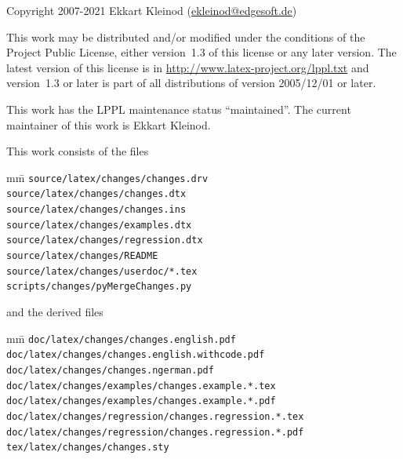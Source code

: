 Copyright 2007-2021 Ekkart Kleinod (\href{mailto:ekleinod@edgesoft.de}{ekleinod@edgesoft.de})

This work may be distributed and/or modified under the conditions of the  Project Public License, either version~1.3 of this license or any later version.
The latest version of this license is in \url{http://www.latex-project.org/lppl.txt} and version~1.3 or later is part of all distributions of  version 2005/12/01 or later.

This work has the LPPL maintenance status ``maintained''.
The current maintainer of this work is Ekkart Kleinod.

This work consists of the files

\begin{tabbing}
	mm\=\kill
	\>\texttt{source/latex/changes/changes.drv}\\
	\>\texttt{source/latex/changes/changes.dtx}\\
	\>\texttt{source/latex/changes/changes.ins}\\
	\>\texttt{source/latex/changes/examples.dtx}\\
	\>\texttt{source/latex/changes/regression.dtx}\\
	\>\texttt{source/latex/changes/README}\\
	\>\texttt{source/latex/changes/userdoc/*.tex}\\

	\>\texttt{scripts/changes/pyMergeChanges.py}
\end{tabbing}


and the derived files

\begin{tabbing}
	mm\=\kill
	\>\texttt{doc/latex/changes/changes.english.pdf}\\
	\>\texttt{doc/latex/changes/changes.english.withcode.pdf}\\
	\>\texttt{doc/latex/changes/changes.ngerman.pdf}\\

	\>\texttt{doc/latex/changes/examples/changes.example.*.tex}\\
	\>\texttt{doc/latex/changes/examples/changes.example.*.pdf}\\

	\>\texttt{doc/latex/changes/regression/changes.regression.*.tex}\\
	\>\texttt{doc/latex/changes/regression/changes.regression.*.pdf}\\

	\>\texttt{tex/latex/changes/changes.sty}
\end{tabbing}


